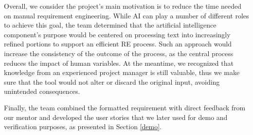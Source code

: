 Overall, we consider the project's main motivation is to reduce the time needed on manual requirement engineering. While AI can play a number of different roles to achieve this goal, the team determined that the artificial intelligence component’s purpose would be centered on processing text into increasingly refined portions to support an efficient RE process. Such an approach would increase the consistency of the outcome of the process, as the central process reduces the impact of human variables. At the meantime, we recognized that knowledge from an experienced project manager is still valuable, thus we make sure that the tool would not alter or discard the original input, avoiding unintended consequences. 

Finally, the team combined the formatted requirement with direct feedback from our mentor and developed the user stories that we later used for demo and verification purposes, as presented in Section \ref{demo}.